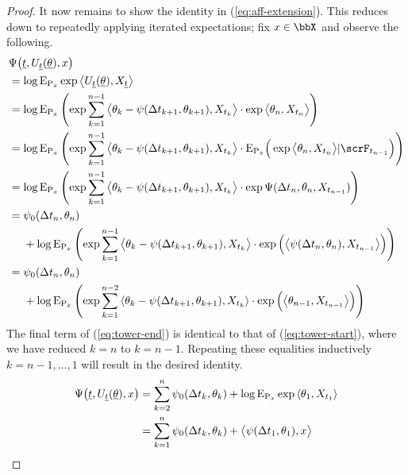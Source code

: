 \begin{proof}
  It now remains to show the identity in (\ref{eq:aff-extension}).
  This reduces down to repeatedly applying iterated expectations; fix $\stateVar \in \stateSpace$ and observe the following.
  \begin{align}
    \notag
    &\aff\big(\underline t, \twistToMoment_{\underline t}(\underline\twistVar), \stateVar\big) \\
    \notag
    &=\log\Exp_{\Prb_\stateVar} \exp\bprj{\twistToMoment_{\underline t}(\underline\twistVar)}{\X_{\underline t}} \\
    \label{eq:tower-start}
    &= \log\Exp_{\Prb_\stateVar}\left( \exp\sum_{k=1}^{n-1} \bprj{\twistVar_k - \affPart(\Delta t_{k+1}, \twistVar_{k+1})}{\X_{t_k}} \cdot \exp\bprj{\twistVar_n}{\X_{t_n}} \right) \\
    \notag
    &= \log\Exp_{\Prb_\stateVar}\left( \exp\sum_{k=1}^{n-1} \bprj{\twistVar_k - \affPart(\Delta t_{k+1}, \twistVar_{k+1})}{\X_{t_k}} \cdot \Exp_{\Prb_\stateVar}\Big(\exp\bprj{\twistVar_n}{\X_{t_n}} |\scrF_{t_{n-1}} \Big) \right) \\
    \notag
    &= \log\Exp_{\Prb_\stateVar}\left( \exp\sum_{k=1}^{n-1} \bprj{\twistVar_k - \affPart(\Delta t_{k+1}, \twistVar_{k+1})}{\X_{t_k}} \cdot \exp\aff(\Delta t_n, \twistVar_n, \X_{t_{n-1}})\right) \\
    \notag
    &= \begin{aligned}[t]
      &\affPart_0(\Delta t_n, \twistVar_n) \\
      &+ \log\Exp_{\Prb_\stateVar}\left( \exp\sum_{k=1}^{n-1} \bprj{\twistVar_k - \affPart(\Delta t_{k+1}, \twistVar_{k+1})}{\X_{t_k}} \cdot \exp\Big( \bprj{\affPart(\Delta t_n, \twistVar_n)}{\X_{t_{n-1}}} \Big)   \right) 
    \end{aligned} \\
    \label{eq:tower-end}
    &= \begin{aligned}[t]
      &\affPart_0(\Delta t_n, \twistVar_n) \\
      &+ \log\Exp_{\Prb_\stateVar}\left( \exp\sum_{k=1}^{n-2} \prj{\twistVar_k - \affPart(\Delta t_{k+1}, \twistVar_{k+1})}{\X_{t_k}} \cdot \exp\Big( \bprj{\twistVar_{n-1}}{\X_{t_{n-1}}} \Big)   \right) 
    \end{aligned}
  \end{align}
  The final term of (\ref{eq:tower-end}) is identical to that of (\ref{eq:tower-start}), where we have reduced $k = n$ to $k = n-1$.
  Repeating these equalities inductively $k = n -1, \ldots, 1$ will result in the desired identity.
  \begin{align*}
    \Psi\big(\underline t, U_{\underline t}(\underline{\theta}), x\big) 
    &=  \sum_{k=2}^n \psi_0(\Delta t_k, \theta_k)  + \log{\operatorname{E}}_{{\operatorname{P}}_x} \exp{\langle \theta_1 , X_{t_1} \rangle}  \\
    &= \sum_{k=1}^n \psi_0(\Delta t_k, \theta_k) + {\big\langle \psi(\Delta t_1, \theta_1) , x \big\rangle}
  \end{align*}
\end{proof}
